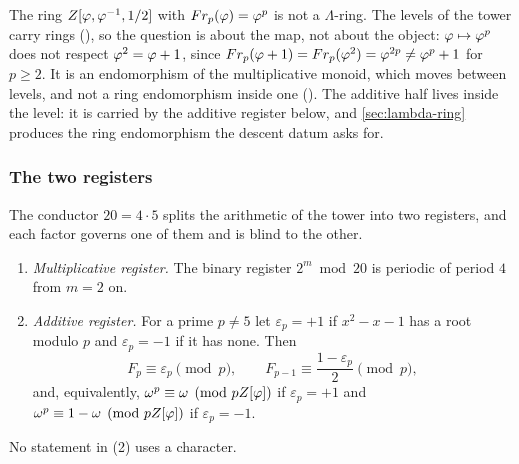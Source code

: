 \begin{remark}\label{rmk:monoid-not-ring}
The ring $Z[\varphi,\varphi^{-1},1/2]$ with $Fr_p(\varphi)=\varphi^p$ is not a
$\Lambda$-ring.  The levels of the tower carry rings
(\cite[\S2.8]{gonzalez26cw}), so the question is about the map, not about the
object: $\varphi\mapsto\varphi^p$ does not respect $\varphi^2=\varphi+1$, since
$Fr_p(\varphi+1)=Fr_p(\varphi^2)=\varphi^{2p}\ne\varphi^p+1$ for $p\ge2$.
It is an endomorphism of the multiplicative monoid, which moves between levels,
and not a ring endomorphism inside one
().
The additive half lives inside the level: it is carried by the additive register
below, and \cref{sec:lambda-ring} produces the ring endomorphism the descent
datum asks for.
\end{remark}

\subsubsection{The two registers}\label{ssec:two-spectra}

The conductor $20=4\cdot5$ splits the arithmetic of the tower into two registers,
and each factor governs one of them and is blind to the other.

\begin{theorem}\label{thm:two-spectra}
\leavevmode
\begin{enumerate}
  \item \emph{Multiplicative register.}  The binary register $2^m\bmod20$ is
    periodic of period $4$ from $m=2$ on.

  \item \emph{Additive register.}  For a prime $p\ne5$ let $\varepsilon_p=+1$ if $x^2-x-1$ has a
    root modulo $p$ and $\varepsilon_p=-1$ if it has none.  Then
    \[
      F_p\equiv\varepsilon_p\pmod p,\qquad
      F_{p-1}\equiv\frac{1-\varepsilon_p}2\pmod p,
    \]
    and, equivalently, $\omega^p\equiv\omega\pmod{pZ[\varphi]}$ if $\varepsilon_p=+1$ and
    $\omega^p\equiv1-\omega\pmod{pZ[\varphi]}$ if $\varepsilon_p=-1$.

\end{enumerate}
\end{theorem}
No statement in (2) uses a character.

